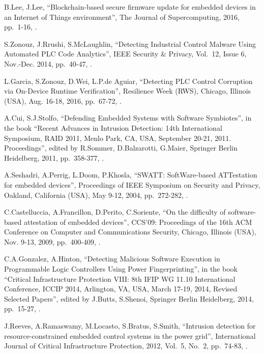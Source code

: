 \begin{thebibliography}{99}
B.Lee, J.Lee,
``Blockchain-based secure firmware update for embedded devices in an Internet of Things environment'',
The Journal of Supercomputing, 2016,
pp.\ 1-16,
.

S.Zonouz, J.Rrushi, S.McLaughlin,
``Detecting Industrial Control Malware Using Automated PLC Code Analytics'',
IEEE Security \& Privacy,
Vol.\ 12, Issue 6,
Nov.-Dec. 2014,
pp.\ 40-47,
.

L.Garcia, S.Zonouz, D.Wei, L.P.de Aguiar,
``Detecting PLC Control Corruption via On-Device Runtime Verification'',
Resilience Week (RWS),
Chicago, Illinois (USA), Aug. 16-18, 2016,
pp.\ 67-72,
.

A.Cui, S.J.Stolfo,
``Defending Embedded Systems with Software Symbiotes'',
in the book ``Recent Advances in Intrusion Detection: 14th International Symposium, RAID 2011, Menlo Park, CA, USA, September 20-21, 2011. Proceedings'',
edited by R.Sommer, D.Balzarotti, G.Maier,
Springer Berlin Heidelberg, 2011,
pp.\ 358-377,
.

A.Seshadri, A.Perrig, L.Doom, P.Khosla,
``SWATT: SoftWare-based ATTestation for embedded devices'',
Proceedings of IEEE Symposium on Security and Privacy,
Oakland, California (USA), May 9-12, 2004,
pp.\ 272-282,
.

C.Castelluccia, A.Francillon, D.Perito, C.Soriente,
``On the difficulty of software-based attestation of embedded devices'',
CCS'09: Proceedings of the 16th ACM Conference on Computer and Communications Security,
Chicago, Illinois (USA), Nov. 9-13, 2009,
pp.\ 400-409,
.

C.A.Gonzalez, A.Hinton,
``Detecting Malicious Software Execution in Programmable Logic Controllers Using Power Fingerprinting'',
in the book ``Critical Infrastructure Protection VIII: 8th IFIP WG 11.10 International Conference, ICCIP 2014, Arlington, VA, USA, March 17-19, 2014, Revised Selected Papers'',
edited by J.Butts, S.Shenoi,
Springer Berlin Heidelberg, 2014,
pp.\ 15-27,
.

J.Reeves, A.Ramaswamy, M.Locasto, S.Bratus, S.Smith,
``Intrusion detection for resource-constrained embedded control systems in the power grid'',
International Journal of Critical Infrastructure Protection, 2012,
Vol.\ 5, No.\ 2,
pp.\ 74-83,
.


\end{thebibliography}
